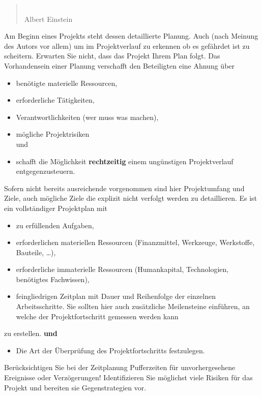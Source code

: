 \renewcommand*{\authorOfNextLines}{Helmut Quinz}
\begin{quote}
		\\
	\small{Albert Einstein}
\end{quote}
Am Beginn eines Projekts steht dessen detaillierte Planung. 
Auch (nach Meinung des Autors vor allem) um im Projektverlauf zu erkennen ob es gefährdet ist zu scheitern.
Erwarten Sie nicht, dass das Projekt Ihrem Plan folgt.
Das Vorhandensein einer Planung verschafft den Beteiligten eine Ahnung über
\begin{itemize}
	\item benötigte materielle Ressourcen,
	\item erforderliche Tätigkeiten, 
	\item Verantwortlichkeiten (wer muss was machen),
	\item mögliche Projektrisiken \\und
	\item schafft die Möglichkeit \textbf{rechtzeitig} einem ungünstigen  Projektverlauf entgegenzusteuern.
\end{itemize}

Sofern nicht bereits ausreichende vorgenommen sind hier Projektumfang und Ziele, auch mögliche Ziele die explizit nicht verfolgt werden zu detaillieren.
Es ist ein vollständiger Projektplan mit
\begin{itemize}
	\item zu erfüllenden Aufgaben,
	\item erforderlichen materiellen Ressourcen (Finanzmittel, Werkzeuge, Werkstoffe, Bauteile, \dots),
	\item erforderliche immaterielle Ressourcen (Humankapital, Technologien, benötigtes Fachwissen), 
	\item feingliedrigen Zeitplan mit Dauer und Reihenfolge der einzelnen Arbeitsschritte. 
			Sie sollten hier auch zusätzliche Meilensteine einführen, an welche der Projektfortschritt gemessen werden kann
\end{itemize}
 	zu erstellen. \textbf{und}
\begin{itemize}
	\item Die Art der Überprüfung des Projektfortschritts festzulegen.
\end{itemize}
Berücksichtigen Sie bei der Zeitplanung Pufferzeiten für unvorhergesehene Ereignisse oder Verzögerungen!
Identifizieren Sie möglichst viele Risiken für das Projekt und bereiten sie Gegenstrategien vor.\\

